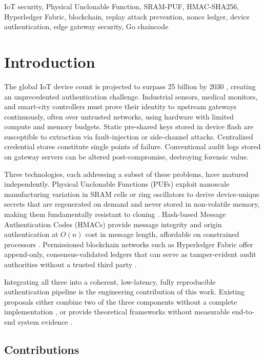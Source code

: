 \documentclass[conference]{IEEEtran}
\begin{document}
\begin{IEEEkeywords}
IoT security, Physical Unclonable Function, SRAM-PUF, HMAC-SHA256, Hyperledger Fabric, blockchain, replay attack prevention, nonce ledger, device authentication, edge gateway security, Go chaincode
\end{IEEEkeywords}

\section{Introduction}
\label{sec:intro}

The global IoT device count is projected to surpass 25 billion by 2030 \cite{ericsson2023}, creating an unprecedented authentication challenge. Industrial sensors, medical monitors, and smart-city controllers must prove their identity to upstream gateways continuously, often over untrusted networks, using hardware with limited compute and memory budgets. Static pre-shared keys stored in device flash are susceptible to extraction via fault-injection or side-channel attacks. Centralized credential stores constitute single points of failure. Conventional audit logs stored on gateway servers can be altered post-compromise, destroying forensic value.

Three technologies, each addressing a subset of these problems, have matured independently. Physical Unclonable Functions (PUFs) exploit nanoscale manufacturing variation in SRAM cells or ring oscillators to derive device-unique secrets that are regenerated on demand and never stored in non-volatile memory, making them fundamentally resistant to cloning \cite{herder2014puf,suh2007physical}. Hash-based Message Authentication Codes (HMACs) provide message integrity and origin authentication at $O(n)$ cost in message length, affordable on constrained processors \cite{rfc2104}. Permissioned blockchain networks such as Hyperledger Fabric offer append-only, consensus-validated ledgers that can serve as tamper-evident audit authorities without a trusted third party \cite{fabric_docs}.

Integrating all three into a coherent, low-latency, fully reproducible authentication pipeline is the engineering contribution of this work. Existing proposals either combine two of the three components without a complete implementation \cite{lee2020puf}, or provide theoretical frameworks without measurable end-to-end system evidence \cite{xu2018blendcac}.

\subsection{Contributions}
\end{document}
